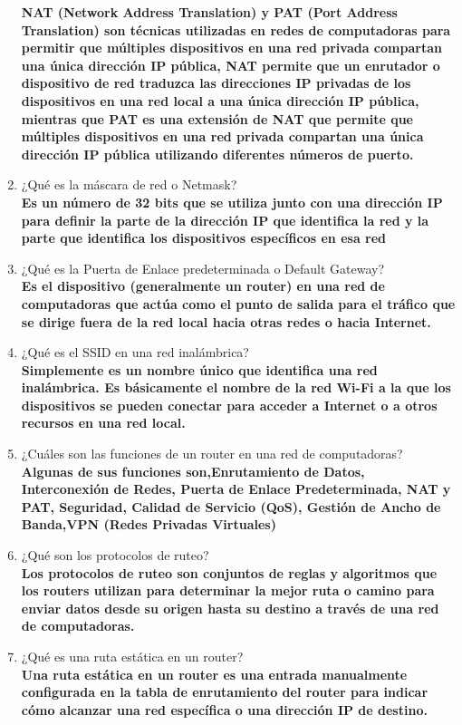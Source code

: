 \documentclass[14pt]{book}
\begin{document}
\begin{enumerate}
  \textbf{NAT (Network Address Translation) y PAT (Port Address Translation) son técnicas utilizadas en redes de computadoras para permitir que múltiples dispositivos en una red privada compartan una única dirección IP pública, NAT permite que un enrutador o dispositivo de red traduzca las direcciones IP privadas de los dispositivos en una red local a una única dirección IP pública, mientras que PAT es una extensión de NAT que permite que múltiples dispositivos en una red privada compartan una única dirección IP pública utilizando diferentes números de puerto.}
  \item ¿Qué es la máscara de red o Netmask?\\
  \textbf{Es  un número de 32 bits que se utiliza junto con una dirección IP para definir la parte de la dirección IP que identifica la red y la parte que identifica los dispositivos específicos en esa red}
  \item ¿Qué es la Puerta de Enlace predeterminada o Default Gateway?\\
  \textbf{Es el dispositivo (generalmente un router) en una red de computadoras que actúa como el punto de salida para el tráfico que se dirige fuera de la red local hacia otras redes o hacia Internet.}
  \item ¿Qué es el SSID en una red inalámbrica?\\
  \textbf{Simplemente  es un nombre único que identifica una red inalámbrica. Es básicamente el nombre de la red Wi-Fi a la que los dispositivos se pueden conectar para acceder a Internet o a otros recursos en una red local.}
  \item  ¿Cuáles son las funciones de un router en una red de computadoras?\\
  \textbf{Algunas de sus funciones son,Enrutamiento de Datos, Interconexión de Redes, Puerta de Enlace Predeterminada, NAT y PAT, Seguridad, Calidad de Servicio (QoS), Gestión de Ancho de Banda,VPN (Redes Privadas Virtuales)}
  \item ¿Qué son los protocolos de ruteo?\\
  \textbf{Los protocolos de ruteo son conjuntos de reglas y algoritmos que los routers utilizan para determinar la mejor ruta o camino para enviar datos desde su origen hasta su destino a través de una red de computadoras.}
  \item ¿Qué es una ruta estática en un router?\\
  \textbf{Una ruta estática en un router es una entrada manualmente configurada en la tabla de enrutamiento del router para indicar cómo alcanzar una red específica o una dirección IP de destino.}

\end{enumerate}
\end{document}
